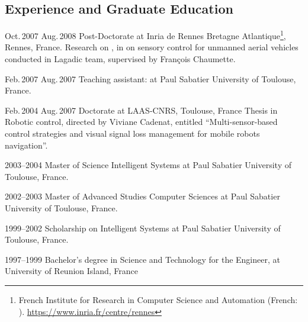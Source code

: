 \subsection{Experience and Graduate Education}
\noindent
\begin{CV}
  \item[Oct.\,2007 Aug.\,2008] {Post-Doctorate}  
    {at Inria de Rennes Bretagne Atlantique\footnote{French Institute for Research in Computer Science and Automation (French: ).  \url{https://www.inria.fr/centre/rennes}}, {Rennes, France}}. \newline
     {\smaller Research on , in on sensory control for unmanned aerial vehicles conducted in Lagadic team, supervised by François Chaumette.}
     
  \item[Feb.\,2007 Aug.\,2007] {Teaching assistant}: {\smaller{}} {at Paul Sabatier University of Toulouse, {France}}.
  
  \item[Feb.\,2004 Aug.\,2007] {Doctorate} {at LAAS-CNRS, {Toulouse, France}} \newline
  {\smaller \PhD Thesis in Robotic control, directed by Viviane Cadenat, entitled \enquote{Multi-sensor-based control strategies and visual signal loss management for mobile robots navigation}.}
  
  \item[2003--2004] {Master of Science}  Intelligent Systems  {at Paul Sabatier University of Toulouse, {France}}.
  \item[2002--2003] {Master of Advanced Studies}  Computer Sciences {at Paul Sabatier University of Toulouse, {France}}.
  \item[1999--2002] Scholarship  on Intelligent Systems  {at Paul Sabatier University of Toulouse, {France}}.
  \item[1997--1999] {Bachelor's degree}  in Science and Technology for the Engineer,
  {at University of Reunion Island, {France}} 
\end{CV}

